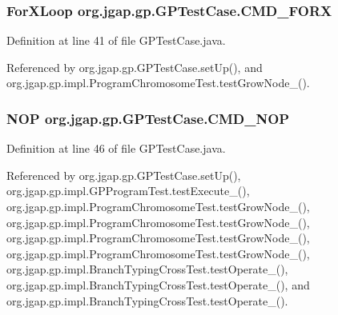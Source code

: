 \hypertarget{classorg_1_1jgap_1_1gp_1_1_g_p_test_case_afceeb3c201cfeeaf8f3a5336d0dbb63b}{
\subsubsection[{C\-M\-D\-\_\-\-F\-O\-R\-X}]{\setlength{\rightskip}{0pt plus 5cm}For\-X\-Loop org.\-jgap.\-gp.\-G\-P\-Test\-Case.\-C\-M\-D\-\_\-\-F\-O\-R\-X\hspace{0.3cm}{\ttfamily [protected]}}}\label{classorg_1_1jgap_1_1gp_1_1_g_p_test_case_afceeb3c201cfeeaf8f3a5336d0dbb63b}


Definition at line 41 of file G\-P\-Test\-Case.\-java.



Referenced by org.\-jgap.\-gp.\-G\-P\-Test\-Case.\-set\-Up(), and org.\-jgap.\-gp.\-impl.\-Program\-Chromosome\-Test.\-test\-Grow\-Node\-\_().

\hypertarget{classorg_1_1jgap_1_1gp_1_1_g_p_test_case_a3a9bc4b6209f17613203db19f0f249cc}{
\subsubsection[{C\-M\-D\-\_\-\-N\-O\-P}]{\setlength{\rightskip}{0pt plus 5cm}N\-O\-P org.\-jgap.\-gp.\-G\-P\-Test\-Case.\-C\-M\-D\-\_\-\-N\-O\-P\hspace{0.3cm}{\ttfamily [protected]}}}\label{classorg_1_1jgap_1_1gp_1_1_g_p_test_case_a3a9bc4b6209f17613203db19f0f249cc}


Definition at line 46 of file G\-P\-Test\-Case.\-java.



Referenced by org.\-jgap.\-gp.\-G\-P\-Test\-Case.\-set\-Up(), org.\-jgap.\-gp.\-impl.\-G\-P\-Program\-Test.\-test\-Execute\-\_(), org.\-jgap.\-gp.\-impl.\-Program\-Chromosome\-Test.\-test\-Grow\-Node\-\_(), org.\-jgap.\-gp.\-impl.\-Program\-Chromosome\-Test.\-test\-Grow\-Node\-\_(), org.\-jgap.\-gp.\-impl.\-Program\-Chromosome\-Test.\-test\-Grow\-Node\-\_(), org.\-jgap.\-gp.\-impl.\-Program\-Chromosome\-Test.\-test\-Grow\-Node\-\_(), org.\-jgap.\-gp.\-impl.\-Branch\-Typing\-Cross\-Test.\-test\-Operate\-\_(), org.\-jgap.\-gp.\-impl.\-Branch\-Typing\-Cross\-Test.\-test\-Operate\-\_(), and org.\-jgap.\-gp.\-impl.\-Branch\-Typing\-Cross\-Test.\-test\-Operate\-\_().

